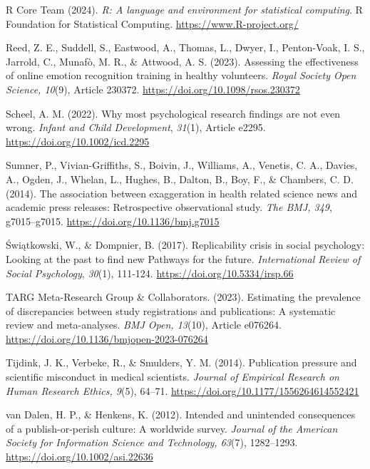 \documentclass[authordate, meta]{jote-new-article}
\begin{document}
	R Core Team (2024). \emph{R: A language and environment for statistical computing}. R Foundation for Statistical Computing. \url{https://www.R-project.org/}



	Reed, Z. E., Suddell, S., Eastwood, A., Thomas, L., Dwyer, I., Penton-Voak, I. S., Jarrold, C., Munafò, M. R., \& Attwood, A. S. (2023). Assessing the effectiveness of online emotion recognition training in healthy volunteers. \emph{Royal Society Open Science, 10}(9), Article 230372. \url{https://doi.org/10.1098/rsos.230372}



	Scheel, A. M. (2022). Why most psychological research findings are not even wrong. \emph{Infant and Child Development}, \emph{31}(1), Article e2295. \url{https://doi.org/10.1002/icd.2295}



	Sumner, P., Vivian-Griffiths, S., Boivin, J., Williams, A., Venetis, C. A., Davies, A., Ogden, J., Whelan, L., Hughes, B., Dalton, B., Boy, F., \& Chambers, C. D. (2014). The association between exaggeration in health related science news and academic press releases: Retrospective observational study. \emph{The BMJ}\emph{, 349}, g7015--g7015. \url{https://doi.org/10.1136/bmj.g7015}



	Świątkowski, W., \& Dompnier, B. (2017). Replicability crisis in social psychology: Looking at the past to find new Pathways for the future. \emph{International Review of Social Psychology}, \emph{30}(1), 111-124. \url{https://doi.org/10.5334/irsp.66}



	TARG Meta-Research Group \& Collaborators. (2023). Estimating the prevalence of discrepancies between study registrations and publications: A systematic review and meta-analyses. \emph{BMJ Open, 13}(10), Article e076264. \url{https://doi.org/10.1136/bmjopen-2023-076264}



	Tijdink, J. K., Verbeke, R., \& Smulders, Y. M. (2014). Publication pressure and scientific misconduct in medical scientists. \emph{Journal of Empirical Research on Human Research Ethics, 9}(5), 64--71. \url{https://doi.org/10.1177/1556264614552421}



	van Dalen, H. P., \& Henkens, K. (2012). Intended and unintended consequences of a publish-or-perish culture: A worldwide survey. \emph{Journal of the American Society for Information Science and Technology, 63}(7), 1282--1293. \url{https://doi.org/10.1002/asi.22636}
\end{document}
